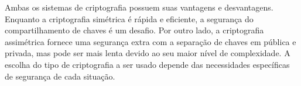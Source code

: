 Ambas os sistemas de criptografia possuem suas vantagens e desvantagens.
Enquanto a criptografia simétrica é rápida e eficiente, a segurança do
compartilhamento de chaves é um desafio. Por outro lado, a criptografia
assimétrica fornece uma segurança extra com a separação de chaves em pública e
privada, mas pode ser mais lenta devido ao seu maior nível de complexidade. A
escolha do tipo de criptografia a ser usado depende das necessidades
específicas de segurança de cada situação.
